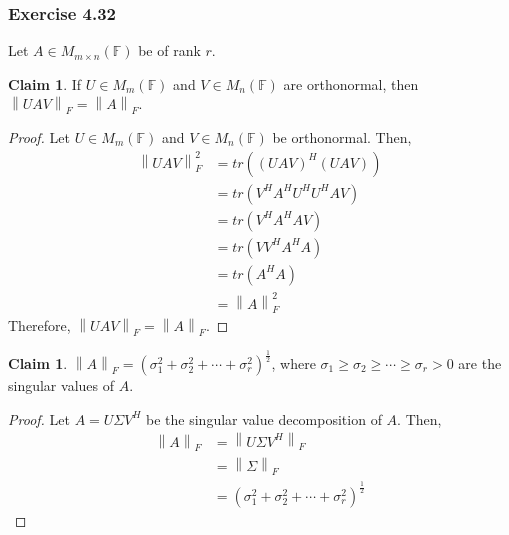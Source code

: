 \documentclass[letterpaper,12pt]{article}
\theoremstyle{definition}
\newtheorem{claim}[theorem]{Claim}
\newcommand{\norm}[1]{\left\lVert#1\right\rVert}
\begin{document}
\subsubsection*{Exercise 4.32}
Let $A \in M_{m \times n} (\mathbb{F})$ be of rank $r$.
\begin{claim}
	If $U \in M_m (\mathbb{F})$ and $V \in M_n (\mathbb{F})$ are orthonormal, then $\norm{UAV}_F = \norm{A}_F$.
\end{claim}
\begin{proof}
	Let $U \in M_m (\mathbb{F})$ and $V \in M_n (\mathbb{F})$ be orthonormal. Then,
	\begin{align*}
	\norm{UAV}^2_F &= tr((UAV)^H (UAV)) \\
	&= tr(V^H A^H U^H U^H A V) \\
	&= tr(V^H A^H A V) \\
	&= tr(V V^H A^H A) \\
	&= tr(A^H A) \\
	&= \norm{A}^2_F
	\end{align*}
	Therefore, $\norm{UAV}_F = \norm{A}_F$.
\end{proof}

\begin{claim}
	$\norm{A}_F = (\sigma^2_1 + \sigma^2_2 + \cdots + \sigma^2_r)^{\frac{1}{2}}$, where $\sigma_1 \geq \sigma_2 \geq \cdots \geq \sigma_r > 0$ are the singular values of $A$.
\end{claim}
\begin{proof}
	Let $A = U \Sigma V^H$ be the singular value decomposition of $A$. Then,
	\begin{align*}
	\norm{A}_F &= \norm{U \Sigma V^H}_F \\
	&= \norm{\Sigma}_F \tag{by the above claim, as $U,V$ are orthonormal} \\
	&= (\sigma^2_1 + \sigma^2_2 + \cdots + \sigma^2_r)^{\frac{1}{2}}
	\end{align*}
\end{proof}
\end{document}
